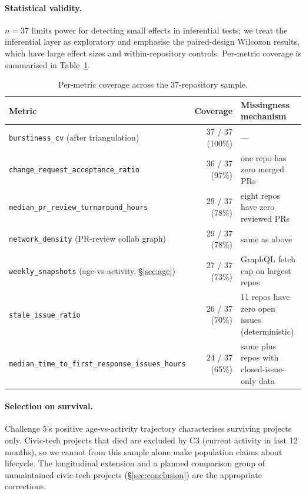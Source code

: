 \documentclass[a4paper,UKenglish,cleveref,autoref,thm-restate]{lipics-v2021}
\begin{document}
\paragraph{Statistical validity.}
$n = 37$ limits power for detecting small effects in inferential tests; we treat the inferential layer as exploratory and emphasise the paired-design Wilcoxon results, which have large effect sizes and within-repository controls. Per-metric coverage is summarised in Table~\ref{tab:coverage}.

\begin{table}[t]
\centering
\caption{Per-metric coverage across the 37-repository sample.}\label{tab:coverage}
\small
\begin{tabular}{l r l}
\toprule
\textbf{Metric}                                         & \textbf{Coverage} & \textbf{Missingness mechanism} \\
\midrule
\texttt{burstiness\_cv} (after triangulation)           & 37 / 37 (100\%) & --- \\
\texttt{change\_request\_acceptance\_ratio}             & 36 / 37 (97\%)  & one repo has zero merged PRs \\
\texttt{median\_pr\_review\_turnaround\_hours}          & 29 / 37 (78\%)  & eight repos have zero reviewed PRs \\
\texttt{network\_density} (PR-review collab graph)      & 29 / 37 (78\%)  & same as above \\
\texttt{weekly\_snapshots} (age-vs-activity, \S\ref{sec:age}) & 27 / 37 (73\%) & GraphQL fetch cap on largest repos \\
\texttt{stale\_issue\_ratio}                            & 26 / 37 (70\%)  & 11 repos have zero open issues (deterministic) \\
\texttt{median\_time\_to\_first\_response\_issues\_hours} & 24 / 37 (65\%) & same plus repos with closed-issue-only data \\
\bottomrule
\end{tabular}
\end{table}

\paragraph{Selection on survival.}
Challenge 5's positive age-vs-activity trajectory characterises surviving projects only. Civic-tech projects that died are excluded by C3 (current activity in last 12 months), so we cannot from this sample alone make population claims about lifecycle. The longitudinal extension and a planned comparison group of unmaintained civic-tech projects (\S\ref{sec:conclusion}) are the appropriate corrections.
\end{document}
